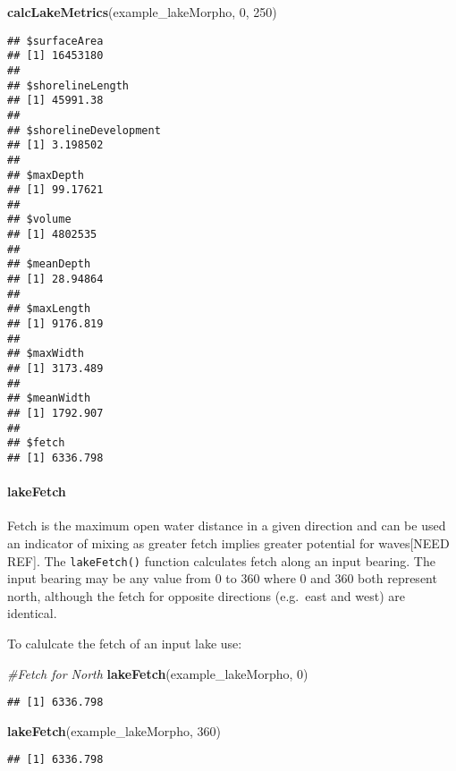 \documentclass[11pt,]{article}
\newenvironment{Shaded}{\begin{snugshade}}{\end{snugshade}}
\newcommand{\KeywordTok}[1]{\textcolor[rgb]{0.13,0.29,0.53}{\textbf{{#1}}}}
\newcommand{\DecValTok}[1]{\textcolor[rgb]{0.00,0.00,0.81}{{#1}}}
\newcommand{\CommentTok}[1]{\textcolor[rgb]{0.56,0.35,0.01}{\textit{{#1}}}}
\newcommand{\NormalTok}[1]{{#1}}
\begin{document}
\begin{Shaded}
\begin{Highlighting}[]
\KeywordTok{calcLakeMetrics}\NormalTok{(example_lakeMorpho, }\DecValTok{0}\NormalTok{, }\DecValTok{250}\NormalTok{)}
\end{Highlighting}
\end{Shaded}

\begin{verbatim}
## $surfaceArea
## [1] 16453180
## 
## $shorelineLength
## [1] 45991.38
## 
## $shorelineDevelopment
## [1] 3.198502
## 
## $maxDepth
## [1] 99.17621
## 
## $volume
## [1] 4802535
## 
## $meanDepth
## [1] 28.94864
## 
## $maxLength
## [1] 9176.819
## 
## $maxWidth
## [1] 3173.489
## 
## $meanWidth
## [1] 1792.907
## 
## $fetch
## [1] 6336.798
\end{verbatim}

\paragraph{lakeFetch}\label{lakefetch}

Fetch is the maximum open water distance in a given direction and can be
used an indicator of mixing as greater fetch implies greater potential
for waves{[}NEED REF{]}. The \texttt{lakeFetch()} function calculates
fetch along an input bearing. The input bearing may be any value from 0
to 360 where 0 and 360 both represent north, although the fetch for
opposite directions (e.g.~east and west) are identical.

To calulcate the fetch of an input lake use:

\begin{Shaded}
\begin{Highlighting}[]
\CommentTok{#Fetch for North}
\KeywordTok{lakeFetch}\NormalTok{(example_lakeMorpho, }\DecValTok{0}\NormalTok{)}
\end{Highlighting}
\end{Shaded}

\begin{verbatim}
## [1] 6336.798
\end{verbatim}

\begin{Shaded}
\begin{Highlighting}[]
\KeywordTok{lakeFetch}\NormalTok{(example_lakeMorpho, }\DecValTok{360}\NormalTok{)}
\end{Highlighting}
\end{Shaded}

\begin{verbatim}
## [1] 6336.798
\end{verbatim}
\end{document}

